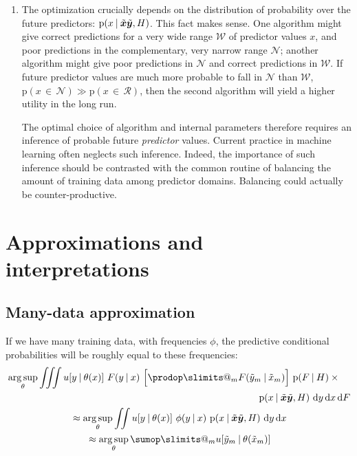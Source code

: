 \documentclass[\ifafour a4paper,12pt,\else a5paper,10pt,\fi%
onecolumn,oneside,article,%
british%
]{memoir}
\makeatletter
\theoremstyle{remark}
\theoremstyle{innote}
\def\sum{\DOTSI\sumop\slimits@}
\def\prod{\DOTSI\prodop\slimits@}
\newcommand*{\di}{\mathrm{d}}%
\newcommand*{\p}{\mathrm{p}}%
\renewcommand*{\|}[1][]{\nonscript\:#1\vert\nonscript\:\mathopen{}}
\newcommand*{\mo}[1][=]{\mathord{\,#1\,}}
\newcommand*{\wrench}{{\fontencoding{U}\fontfamily{fontawesomethree}\selectfont\symbol{114}}}
\newcommand{\mynote}[1]{ {\color{notecolour}#1}}
\DeclareMathOperator*{\argsup}{arg\,sup}
\newcommand*{\xxx}[1]{\tilde{x}_{#1}}
\newcommand*{\yyy}[1]{\tilde{y}_{#1}}
\newcommand*{\bzz}{\tilde{\bm{x}}\tilde{\bm{y}}}
\makeatother
\begin{document}
\begin{enumerate}[label=\textbf{(\Alph*)}, wide]
  Second, a probabilistic variant of a candidate algorithm might be most
  appropriate for the inferential part (for example because it is a
  non-parametric algorithm), and yet the final optimization might select a
  different candidate algorithm. \mynote{\wrench\ This must be explained
    much better.}
  
\item\label{item:px_needed} The optimization crucially depends on the
  distribution of probability over the future predictors: $\p(x\|\bzz,H)$.
  This fact makes sense. One algorithm might give correct predictions for a
  very wide range $\mathcal{W}$ of predictor values $x$, and poor
  predictions in the complementary, very narrow range $\mathcal{N}$;
  another algorithm might give poor predictions in $\mathcal{N}$ and
  correct predictions in $\mathcal{W}$. If future predictor values are much
  more probable to fall in $\mathcal{N}$ than $\mathcal{W}$,
    $\p(x \mo[\in] \mathcal{N}) \gg \p(x \mo[\in] \mathcal{R})$, then the
  second algorithm will yield a higher utility in the long run.

  The optimal choice of algorithm and internal parameters therefore
  requires an inference of probable future \emph{predictor} values. Current
  practice in machine learning often neglects such inference. Indeed, the
  importance of such inference should be contrasted with the common routine
  of balancing the amount of training data among predictor domains.
  Balancing could actually be counter-productive.
\end{enumerate}


\section{Approximations and interpretations}
\label{sec:approx_interpr}

\subsection{Many-data approximation}
\label{sec:manydata_approx}

If we have many training data, with frequencies $\phi$, the predictive
conditional probabilities will be roughly equal to these frequencies:
\begin{multline}
  \begin{multlined}[][0.8\linewidth]
  \argsup_{\theta} \iiint u[y \| \theta(x)] \ 
      F(y\|x)\ 
      \Bigl[\prod_{m} F(\yyy{m}\|\xxx{m})\Bigr]\ 
      \p(F \| H)\times{}\\
      \p(x \| \bzz, H)\
      \di y\,\di x\,\di F
    \end{multlined}
    \\
{}\approx \argsup_{\theta} \iint u[y \| \theta(x)] \ 
      \phi(y\|x)\ 
      \p(x \| \bzz, H)\
      \di y\,\di x
    \\
{}\approx \argsup_{\theta} \sum_{m} u[\yyy{m} \| \theta(\xxx{m})] 
\end{multline}
\end{document}

